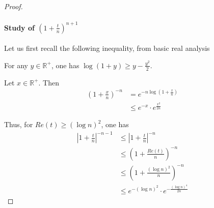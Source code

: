 \documentclass[../main.tex]{subfiles}
\begin{document}
\begin{proof}
	\paragraph{Study of $\left(1 + \frac{t}{n} \right)^{n+1}$}
	Let us first recall the following inequality, from basic real analysis
	\begin{remark}
		For any $y \in \mathbb{R}^+$, one has $\log (1 + y) \geq y - \frac{y^2}{2}$.
	\end{remark}
	
	Let $x \in \mathbb{R}^+$. Then
	\begin{align*}
	{\left(1 + \frac{x}{n} \right)}^{-n}
	&= e^{-n \log \left( 1 + \frac{x}{n} \right)}\\
	&\leq e^{-x} \cdot e^{\frac{x^2}{2n}}
	\end{align*}
	
	Thus, for $Re(t) \geq {\left(\log n \right)}^2$, one has
	\begin{align*}
		{\left|1 + \frac{t}{n}\right|}^{-n-1} &\leq {\left|1 + \frac{t}{n}\right|}^{-n}\\
				&\leq {\left(1 + \frac{Re(t)}{n} \right)}^{-n}\\
				&\leq {\left(1 + \frac{{\left(\log n \right)}^2}{n}\right)}^{-n}\\
				&\leq e^{-{(\log n)}^2} \cdot e^{-\frac{{(\log n)}^4}{2n}}
	\end{align*}
\end{proof}
\end{document}
